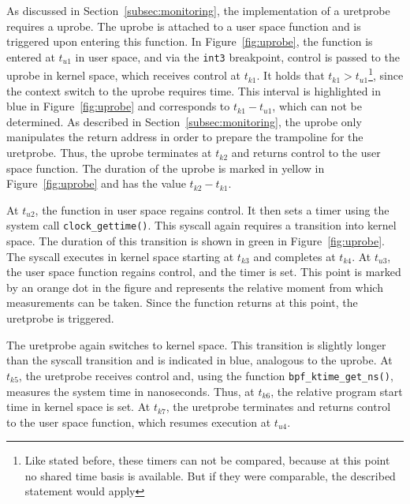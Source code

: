 As discussed in Section~\ref{subsec:monitoring}, the implementation of a \ac{uretprobe} requires a \ac{uprobe}.  
The \ac{uprobe} is attached to a user space function and is triggered upon entering this function.  
In Figure~\ref{fig:uprobe}, the function is entered at $t_{u1}$ in user space, and via the \texttt{int3} breakpoint, control is passed to the \ac{uprobe} in kernel space, which receives control at $t_{k1}$.  
It holds that $t_{k1} > t_{u1}$\footnote{Like stated before, these timers can not be compared, because at this point no shared time basis is available. But if they were comparable, the described statement would apply}, since the context switch to the \ac{uprobe} requires time.  
This interval is highlighted in blue in Figure~\ref{fig:uprobe} and corresponds to $t_{k1} - t_{u1}$, which can not be determined.  
As described in Section~\ref{subsec:monitoring}, the \ac{uprobe} only manipulates the return address in order to prepare the trampoline for the \ac{uretprobe}.  
Thus, the \ac{uprobe} terminates at $t_{k2}$ and returns control to the user space function.  
The duration of the \ac{uprobe} is marked in yellow in Figure~\ref{fig:uprobe} and has the value $t_{k2} - t_{k1}$.  

At $t_{u2}$, the function in user space regains control.  
It then sets a timer using the system call \texttt{clock\_gettime()}.  
This syscall again requires a transition into kernel space.  
The duration of this transition is shown in green in Figure~\ref{fig:uprobe}.  
The syscall executes in kernel space starting at $t_{k3}$ and completes at $t_{k4}$.  
At $t_{u3}$, the user space function regains control, and the timer is set.  
This point is marked by an orange dot in the figure and represents the relative moment from which measurements can be taken.  
Since the function returns at this point, the \ac{uretprobe} is triggered.  

The \ac{uretprobe} again switches to kernel space.  
This transition is slightly longer than the syscall transition and is indicated in blue, analogous to the \ac{uprobe}.  
At $t_{k5}$, the \ac{uretprobe} receives control and, using the function \texttt{bpf\_ktime\_get\_ns()}, measures the system time in nanoseconds.  
Thus, at $t_{k6}$, the relative program start time in kernel space is set.  
At $t_{k7}$, the \ac{uretprobe} terminates and returns control to the user space function, which resumes execution at $t_{u4}$.  

